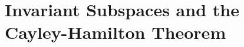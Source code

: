 \section{Invariant Subspaces and the Cayley-Hamilton Theorem}\label{sec:5.4}

\exercisesection

\begin{ex}\label{ex:5.4.25}

\end{ex}

\begin{ex}\label{ex:5.4.32}

\end{ex}
